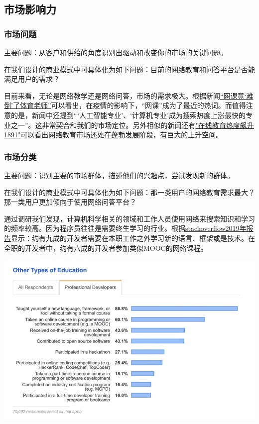 \documentclass[a4paper]{ctexart}
\begin{document}
\subsection{市场影响力}
\subsubsection{市场问题}
主要问题：从客户和供给的角度识别出驱动和改变你的市场的关键问题。

在我们设计的商业模式中可具体化为如下问题：目前的网络教育和问答平台是否能满足用户的需求？

目前来看，无论是网络教学还是网络问答，市场的需求极大。根据新闻\href{https://www.sohu.com/a/380498782_99900743}{“网课竟‘难倒’了体育老师”}可以看出，在疫情的影响下，“网课”成为了最近的热词。而值得注意的是，新闻中还提到“‘人工智能专业’、‘计算机专业’成为搜索热度上涨最快的专业之一”。这非常契合和我们的市场定位。另外相似的新闻还有\href{https://www.donews.com/news/detail/1/3085749.html}{"在线教育热度飙升1891"}可以看出网络教育市场还处在蓬勃发展阶段，有巨大的上升空间。


\subsubsection{市场分类}
主要问题：识别主要的市场群体，描述他们的兴趣点，尝试发现新的群体。

在我们设计的商业模式中可具体化为如下问题：那一类用户的网络教育需求最大？那一类用户更加倾向于使用网络问答平台？

通过调研我们发现，计算机科学相关的领域和工作人员使用网络来搜索知识和学习的频率较高。因为程序员往往是需要终生学习的行业。根据\href{https://insights.stackoverflow.com/survey/2019}{stackoverflow2019年报告}显示：约有九成的开发者需要在本职工作之外学习新的语言、框架或是技术。在全职的开发者中，约有六成的开发者参加类似MOOC的网络课程。

\begin{center}
  \includegraphics[scale=0.4]{市场分析.png}
\end{center}
\end{document}
